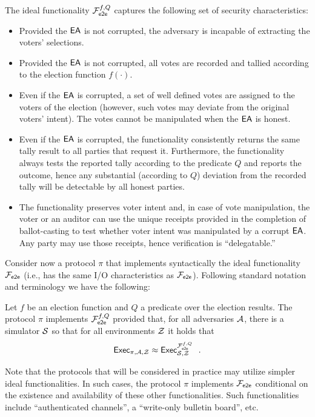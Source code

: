 The ideal functionality $\mathcal{F}_{\mathsf{e2e}}^{f,Q}$ captures the following set of
security characteristics:

\begin{itemize}
\item Provided the $\mathsf{EA}$ is not corrupted, the adversary is incapable
  of extracting the voters' selections.

\item Provided the $\mathsf{EA}$ is not corrupted, all votes are recorded and
  tallied according to the election function $f(\cdot)$.

\item Even if the $\mathsf{EA}$ is corrupted, a set of well defined votes are
  assigned to the voters of the election (however, such votes may
  deviate from the original voters' intent). The votes cannot be
  manipulated when the $\mathsf{EA}$ is honest.

\item Even if the $\mathsf{EA}$ is corrupted, the functionality consistently
  returns the same tally result to all parties that request
  it. Furthermore, the functionality always tests the reported tally
  according to the predicate $Q$ and reports the outcome, hence any
  substantial (according to $Q$) deviation from the recorded tally
  will be detectable by all honest parties.

\item The functionality preserves voter intent and, in case of vote
  manipulation, the voter or an auditor can use the unique receipts
  provided in the completion of ballot-casting to test whether voter
  intent was manipulated by a corrupt $\mathsf{EA}$. Any party may use those
  receipts, hence verification is ``delegatable.''
\end{itemize}

Consider now a protocol $\pi$ that implements syntactically the ideal
functionality $\mathcal{F}_{\mathsf{e2e}}$ (i.e., has the same I/O characteristics as
$\mathcal{F}_{\mathsf{e2e}}$). Following standard notation and terminology we have the
following:


\begin{definition}
Let $f$ be an election function and $Q$ a predicate over the election results. 
The protocol $\pi$ implements $\mathcal{F}_{\mathsf{e2e}}^{f,Q}$  provided that, for all adversaries $\mathcal{A}$, there
is a simulator $\mathcal{S}$ so that for all environments $\mathcal{Z}$ it holds that 
\[ \mathsf{Exec}_{\pi, \mathcal{A}, \mathcal{Z}} \approx
\mathsf{Exec}^{\mathcal{F}_{\mathsf{e2e}}^{f,Q}}_{\mathcal{S},\mathcal{Z}}  \ \ .\]
\end{definition}

Note that the protocols that will be considered in practice may utilize simpler ideal
functionalities. In such cases, the protocol $\pi$ implements $\mathcal{F}_{\mathsf{e2e}}$ conditional on the
existence and availability of these other functionalities. Such functionalities include
``authenticated channels'', a ``write-only bulletin board'', etc.


